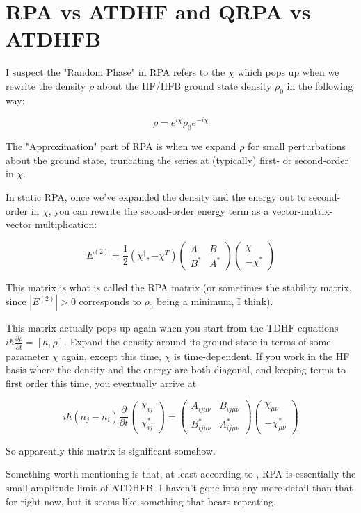 \chapter{RPA vs ATDHF and QRPA vs ATDHFB}

I suspect the "Random Phase" in RPA refers to the $\chi$ which pops up when we rewrite the density $\rho$ about the HF/HFB ground state density $\rho_0$ in the following way:

\begin{equation}
\rho = e^{i\chi} \rho_0 e^{-i\chi}
\end{equation}

\noindent The "Approximation" part of RPA is when we expand $\rho$ for small perturbations about the ground state, truncating the series at (typically) first- or second-order in $\chi$.

In static RPA, once we've expanded the density and the energy out to second-order in $\chi$, you can rewrite the second-order energy term as a vector-matrix-vector multiplication:

\begin{equation}
E^{(2)} = \frac{1}{2}\left(\chi^\dagger, -\chi^T\right) \left(\begin{array}{cc}
A & B \\
B^* & A^*
\end{array}\right) \left(\begin{array}{c}
\chi \\
-\chi^*
\end{array}\right)
\end{equation}

\noindent This matrix is what is called the RPA matrix (or sometimes the stability matrix, since $|E^{(2)}|>0$ corresponds to $\rho_0$ being a minimum, I think).

This matrix actually pops up again when you start from the TDHF equations $i\hbar\frac{\partial\rho}{\partial t} = [h, \rho]$. Expand the density around its ground state in terms of some parameter $\chi$ again, except this time, $\chi$ is time-dependent. If you work in the HF basis where the density and the energy are both diagonal, and keeping terms to first order this time, you eventually arrive at

\begin{equation}
i\hbar(n_j-n_i)\frac{\partial}{\partial t}\left(\begin{array}{c}
\chi_{ij} \\
\chi_{ij}^*
\end{array}\right) = \left(\begin{array}{cc}
A_{ij\mu\nu} & B_{ij\mu\nu} \\
B^*_{ij\mu\nu} & A^*_{ij\mu\nu}
\end{array}\right) \left(\begin{array}{c}
\chi_{\mu\nu} \\
-\chi^*_{\mu\nu}
\end{array}\right)
\end{equation}

So apparently this matrix is significant somehow.

Something worth mentioning is that, at least according to \cite{Baranger1978}, RPA is essentially the small-amplitude limit of ATDHFB. I haven't gone into any more detail than that for right now, but it seems like something that bears repeating.

